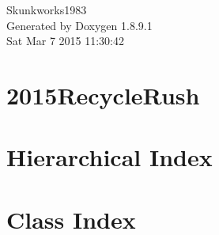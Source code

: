 \documentclass[twoside]{book}
\newcommand{\+}{\discretionary{\mbox{\scriptsize$\hookleftarrow$}}{}{}}
\newcommand{\clearemptydoublepage}{%
  \newpage{\pagestyle{empty}\cleardoublepage}%
}
\begin{document}
\hypersetup{pageanchor=false,
             bookmarks=true,
             bookmarksnumbered=true,
             pdfencoding=unicode
            }
\begin{titlepage}
\vspace*{7cm}
\begin{center}%
{\Large Skunkworks1983 }\\
\vspace*{1cm}
{\large Generated by Doxygen 1.8.9.1}\\
\vspace*{0.5cm}
{\small Sat Mar 7 2015 11:30:42}\\
\end{center}
\end{titlepage}
\clearemptydoublepage
\tableofcontents
\clearemptydoublepage
{}
\hypersetup{pageanchor=true}

\chapter{2015\+Recycle\+Rush}
\label{md__r_e_a_d_m_e}
\hypertarget{md__r_e_a_d_m_e}{}

\chapter{Hierarchical Index}

\chapter{Class Index}

\end{document}
